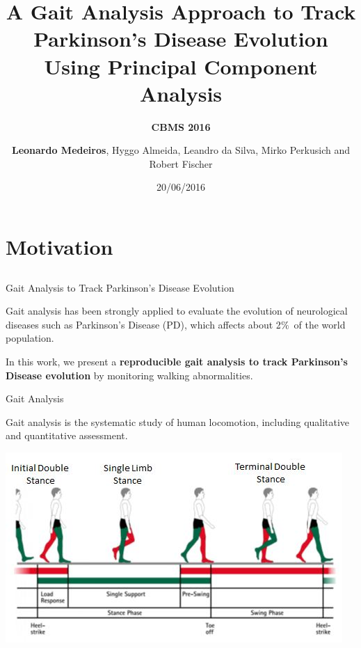 \documentclass{beamer}
\author[]{\textbf{Leonardo Medeiros}, Hyggo Almeida, Leandro da Silva, Mirko Perkusich and Robert Fischer}
\date{20/06/2016}
\institute[]{Federal University Of Campina Grande - BRAZIL
}
\title{A Gait Analysis Approach to Track Parkinson's Disease Evolution Using Principal Component Analysis}
\subtitle{\textbf{CBMS 2016}}
\begin{document}
\begin{frame}
  \titlepage
\end{frame}

{
}






\section{Motivation}
\subsection{}
\begin{frame}{Gait Analysis to Track Parkinson's Disease Evolution}
	\begin{block}{}
	Gait analysis has been strongly applied to evaluate the evolution of neurological diseases such as Parkinson's Disease (PD), which affects about 2$\%$\ of the world population.
	\end{block}

  \begin{block}{}
	In this work, we present a \textbf{reproducible gait analysis to track Parkinson's Disease evolution} by monitoring walking abnormalities. 
  \end{block} 
\end{frame}

\begin{frame}{Gait Analysis}
  \begin{block}{}
  Gait analysis is the systematic study of human locomotion, including qualitative and quantitative assessment.
  \end{block}  
	
	\begin{block}{}
	\includegraphics[height=2.2 in]{img/gait-chart.jpg}
	\end{block}
\end{frame}
\end{document}
